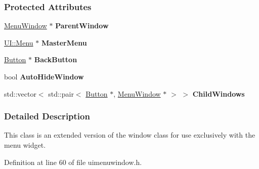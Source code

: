 \subsubsection*{Protected Attributes}
\begin{DoxyCompactItemize}
\item 
\hypertarget{classphys_1_1UI_1_1MenuWindow_a94ec8861afbc6f39ac4b443a912bc0c1}{
\hyperlink{classphys_1_1UI_1_1MenuWindow}{MenuWindow} $\ast$ {\bfseries ParentWindow}}
\label{classphys_1_1UI_1_1MenuWindow_a94ec8861afbc6f39ac4b443a912bc0c1}

\item 
\hypertarget{classphys_1_1UI_1_1MenuWindow_adeed2fd68308846df8885febee141111}{
\hyperlink{classphys_1_1UI_1_1Menu}{UI::Menu} $\ast$ {\bfseries MasterMenu}}
\label{classphys_1_1UI_1_1MenuWindow_adeed2fd68308846df8885febee141111}

\item 
\hypertarget{classphys_1_1UI_1_1MenuWindow_a02826ad4a8d0b8934a7dbe86e4ea3edf}{
\hyperlink{classphys_1_1UI_1_1Button}{Button} $\ast$ {\bfseries BackButton}}
\label{classphys_1_1UI_1_1MenuWindow_a02826ad4a8d0b8934a7dbe86e4ea3edf}

\item 
\hypertarget{classphys_1_1UI_1_1MenuWindow_a7bceef4e75b7f179fb2b71f822c376fd}{
bool {\bfseries AutoHideWindow}}
\label{classphys_1_1UI_1_1MenuWindow_a7bceef4e75b7f179fb2b71f822c376fd}

\item 
\hypertarget{classphys_1_1UI_1_1MenuWindow_ae55c88520920e44c0bb125e812d62272}{
std::vector$<$ std::pair$<$ \hyperlink{classphys_1_1UI_1_1Button}{Button} $\ast$, \hyperlink{classphys_1_1UI_1_1MenuWindow}{MenuWindow} $\ast$ $>$ $>$ {\bfseries ChildWindows}}
\label{classphys_1_1UI_1_1MenuWindow_ae55c88520920e44c0bb125e812d62272}

\end{DoxyCompactItemize}


\subsubsection{Detailed Description}
This class is an extended version of the window class for use exclusively with the menu widget. 

Definition at line 60 of file uimenuwindow.h.



